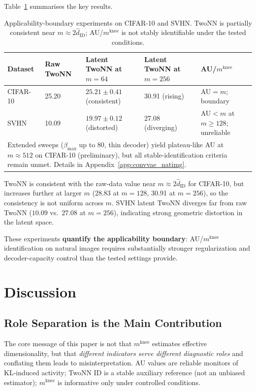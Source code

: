 \documentclass[make,article,submit,pdftex,moreauthors]{Definitions/mdpi}
\newcommand{\mknee}{m^{\mathrm{knee}}}
\newcommand{\hatdID}{\hat{d}_{\mathrm{ID}}}
\begin{document}
Table~\ref{tab:natimg_summary} summarises the key results.

\begin{table}[ht]
\centering
\caption{Applicability-boundary experiments on CIFAR-10 and SVHN.
TwoNN is partially consistent near $m\approx2\hatdID$;
AU/$\mknee$ is not stably identifiable under the tested conditions.}
\label{tab:natimg_summary}
\small
\begin{tabularx}{\linewidth}{lXXXX}
\toprule
Dataset & Raw TwoNN & Latent TwoNN at $m=64$ & Latent TwoNN at $m=256$ & AU/$\mknee$ \\
\midrule
CIFAR-10 & 25.20 & $25.21\pm0.41$ (consistent) & 30.91 (rising) & AU$=m$; boundary \\
SVHN & 10.09 & $19.97\pm0.12$ (distorted) & 27.08 (diverging) & AU$<m$ at $m\geq128$; unreliable \\
\bottomrule
\multicolumn{5}{p{0.97\linewidth}}{\footnotesize
Extended sweeps ($\beta_{\max}$ up to 80, thin decoder) yield plateau-like AU
at $m\approx512$ on CIFAR-10 (preliminary), but all stable-identification
criteria remain unmet. Details in Appendix~\ref{app:convvae_natimg}.}
\end{tabularx}
\end{table}

TwoNN is consistent with the raw-data value near $m\approx2\hatdID$ for
CIFAR-10, but increases further at larger $m$ (28.83 at $m=128$, 30.91 at
$m=256$), so the consistency is not uniform across $m$.
SVHN latent TwoNN diverges far from raw TwoNN ($10.09$ vs.\ $27.08$ at
$m=256$), indicating strong geometric distortion in the latent space.

These experiments \textbf{quantify the applicability boundary}:
AU/$\mknee$ identification on natural images requires substantially stronger
regularization and decoder-capacity control than the tested settings provide.

\section{Discussion}\label{sec:discussion}

\subsection{Role Separation is the Main Contribution}\label{sec:disc_roles}

The core message of this paper is not that $\mknee$ estimates effective
dimensionality, but that \emph{different indicators serve different diagnostic
roles} and conflating them leads to misinterpretation.
AU values are reliable monitors of KL-induced activity; TwoNN ID is a stable
auxiliary reference (not an unbiased estimator); $\mknee$ is informative only
under controlled conditions.
\end{document}
